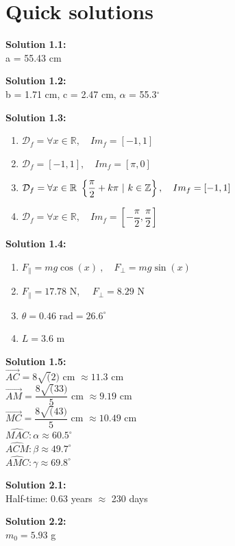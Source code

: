 \documentclass{article}
\newcommand{\solution}[2][]{%
  \par\noindent\textbf{Solution #1:\\} #2\par \vspace*{.25cm}
}
\begin{document}
\newpage
\part*{Quick solutions}
\solution[1.1]{
  a = 55.43 cm
}

\solution[1.2]{
  b = 1.71 cm, c = 2.47 cm, $\alpha$ = 55.3$^\circ$
}

\solution[1.3]{\vspace*{-.5cm}
  \begin{enumerate}
    \item $\mathcal{D}_f = \forall x \in \mathbb{R}, \quad Im_f = \left[-1,1\right]$
    \item $\mathcal{D}_f = \left[-1,1\right], \quad Im_f = \left[\pi, 0\right]$
    \item $\mathcal{D}_f = \forall x \in \mathbb{R} \ \left\{\dfrac{\pi}{2}+k\pi \ |\  k \in \mathbb{Z}\right\}, \quad Im_f = \left[-1,1\right]$
    \item $\mathcal{D}_f = \forall x \in \mathbb{R}, \quad Im_f = \left[-\dfrac{\pi}{2}, \dfrac{\pi}{2}\right]$
  \end{enumerate}
}

\solution[1.4]{
  \vspace*{-0.5cm}
  \begin{enumerate}[label=\alph*.]
    \item $F_\parallel = mg\cos(x)\ , \quad F_\perp = mg\sin(x)$
    \item $F_\parallel = 17.78$ N, $\quad F_\perp = 8.29$ N
    \item $\theta = 0.46 \text{ rad} = 26.6^\circ$
    \item $L = 3.6$ m
  \end{enumerate}
}

\solution[1.5]{
  $\overrightarrow{AC} = 8\sqrt(2)$ cm $\approx 11.3$ cm\\[2ex]
  $\overrightarrow{AM} = \dfrac{8\sqrt(33)}{5}$ cm $\approx 9.19$ cm\\[2ex]
  $\overrightarrow{MC} = \dfrac{8\sqrt(43)}{5}$ cm $\approx 10.49$ cm\\[2ex]
  $\widehat{MAC}: \alpha \approx 60.5^\circ $\\[2ex]
  $\widehat{ACM}: \beta \approx 49.7^\circ$\\[2ex]
  $\widehat{AMC}: \gamma \approx 69.8^\circ$
}

\solution[2.1]{
  Half-time: 0.63 years $\approx$ 230 days
}

\solution[2.2]{
  $m_0 = 5.93$ g
}
\end{document}
